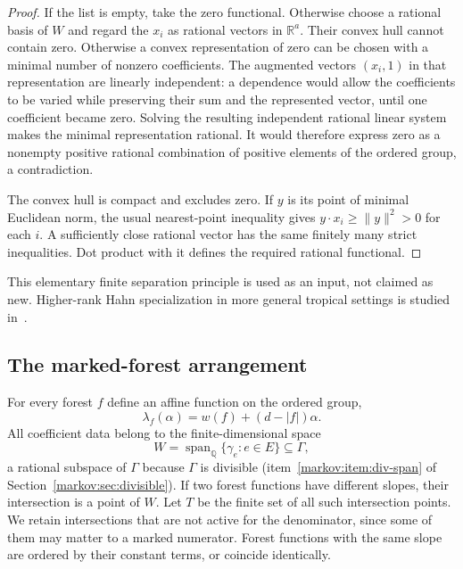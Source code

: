 \documentclass[11pt]{article}
\numberwithin{equation}{section}
\theoremstyle{definition}
\theoremstyle{remark}
\newcommand{\R}{\mathbb R}
\newcommand{\Q}{\mathbb Q}
\newcommand{\Span}{\operatorname{span}}
\begin{document}
\begin{proof}
If the list is empty, take the zero functional. Otherwise choose a rational
basis of $W$ and regard the $x_i$ as rational vectors in
$\R^a$. Their convex hull cannot contain zero. Otherwise a convex representation
of zero can be chosen with a minimal number of nonzero coefficients. The
augmented vectors $(x_i,1)$ in that representation are linearly independent:
a dependence would allow the coefficients to be varied while preserving their
sum and the represented vector, until one coefficient became zero. Solving the
resulting independent rational linear system makes the minimal representation
rational. It would therefore express zero as a nonempty positive rational
combination of positive elements of the ordered group, a contradiction.

The convex hull is compact and excludes zero. If $y$ is its point of minimal
Euclidean norm, the usual nearest-point inequality gives
$y\cdot x_i\ge\|y\|^2>0$ for each $i$. A sufficiently close rational vector has
the same finitely many strict inequalities. Dot product with it defines the
required rational functional.
\end{proof}

This elementary finite separation principle is used as an input, not claimed as
new. Higher-rank Hahn specialization in more general tropical settings is studied
in~\cite{JS}.

\subsection{The marked-forest arrangement}

For every forest $f$ define an affine function on the ordered group,
\[
 \lambda_f(\alpha)=w(f)+(d-|f|)\alpha.
\]
All coefficient data belong to the finite-dimensional space
\[
 W=\Span_\Q\{\gamma_e:e\in E\}\subseteq\Gamma,
\]
a rational subspace of $\Gamma$ because $\Gamma$ is divisible
(item~\ref{markov:item:div-span} of Section~\ref{markov:sec:divisible}).
If two forest functions have different slopes, their intersection is a point of
$W$. Let $T$ be the finite set of all such intersection points. We retain
intersections that are not active for the denominator, since some of them may
matter to a marked numerator. Forest functions with the same slope are ordered
by their constant terms, or coincide identically.
\end{document}
